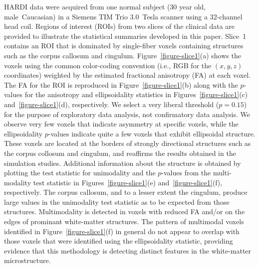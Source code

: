 \documentclass[dvips,aoas,preprint]{imsart}
\numberwithin{equation}{section}
\theoremstyle{plain}
\begin{document}
HARDI data were acquired from one normal subject (30 year old,
male~Caucasian) in a Siemens TIM Trio 3.0~Tesla scanner using a
32-channel head coil.  
Regions of interest (ROIs) from two slices of the clinical data are
provided to illustrate the statistical summaries developed in this
paper.  Slice~1 contains an ROI that is dominated by single-fiber
voxels containing structures such as the corpus callosum and cingulum.
Figure~\ref{figure-slice1}(a) shows the voxels using the common
color-coding convention (i.e., RGB for the $(x,y,z)$ coordinates)
weighted by the estimated fractional anisotropy (FA) at each voxel.
The FA for the ROI is reproduced in Figure~\ref{figure-slice1}(b)
along with the $p$-values for the anisotropy and ellipsoidality
statistics in Figures~\ref{figure-slice1}(c)
and~\ref{figure-slice1}(d), respectively.  We select a very liberal
threshold ($p=0.15$) for the purpose of exploratory data analysis, not
confirmatory data analysis.  We observe very few voxels that indicate
asymmetry at specific voxels, while the ellipsoidality $p$-values
indicate quite a few voxels that exhibit ellipsoidal structure.  These
voxels are located at the borders of strongly directional structures
such as the corpus collosum and cingulum, and reaffirms the results
obtained in the simulation studies.  Additional information about the
structure is obtained by plotting the test statistic for unimodality
and the $p$-values from the multi-modality test statistic in
Figures~\ref{figure-slice1}(e) and~\ref{figure-slice1}(f),
respectively.  The corpus callosum, and to a lesser extent the
cingulum, produce large values in the unimodality test statistic as to
be expected from those structures.  Multimodality is detected in
voxels with reduced FA and/or on the edges of prominant white-matter
structures.  The pattern of multimodal voxels identified in
Figure~\ref{figure-slice1}(f) in general do not appear to overlap with
those voxels that were identified using the ellipsoidality statistic,
providing evidence that this methodology is detecting distinct
features in the white-matter microstructure.
\end{document}
